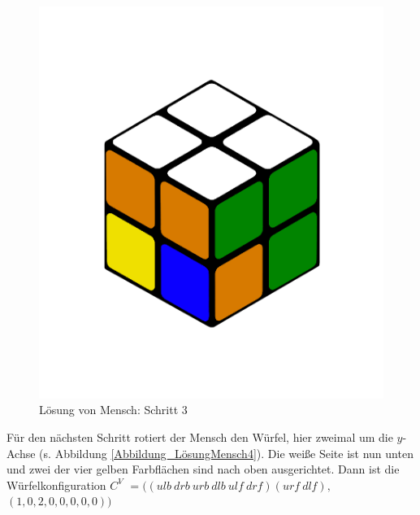 \documentclass[12pt,a4paper, usenames, dvipsnames]{article}
\theoremstyle{mystyle}
\theoremstyle{definition}
\begin{document}
\begin{figure}[H]
\centering
\includegraphics[scale=0.12]{menschSchritt3.png}
\caption[Lösung von Mensch: Schritt 3]{Lösung von Mensch: Schritt 3}
\label{Abbildung_LösungMensch3}
\end{figure} 

Für den nächsten Schritt rotiert der Mensch den Würfel, hier zweimal um die $y$-Achse (s. Abbildung \ref{Abbildung_LösungMensch4}). Die weiße Seite ist nun unten und zwei der vier gelben Farbflächen sind nach oben ausgerichtet. Dann ist die Würfelkonfiguration $C^V $ $= (( \textit{ulb} \ \textit{drb} \ \textit{urb} \ \textit{dlb} \ \textit{ulf} \ \textit{drf} )( \textit{urf} \ \textit{dlf} ),$ $(1,0,2,0,0,0,0,0))$
\end{document}
